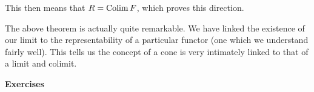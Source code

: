 \begin{prf}
        \begin{center}
        \end{center}
        This then means that $R = \operatorname*{\mathrm{Colim }} F$, which proves this direction.
    \end{prf}

    \begin{remark}
        The above theorem is actually quite remarkable. 
        We have linked the existence of our limit 
        to the representability of a particular 
        functor (one which we understand fairly well).
        This tells us
        the concept of a cone is very intimately linked to that of a 
        limit and colimit.
    \end{remark}

    {\large \textbf{Exercises}
    \vspace{0.5cm}}

